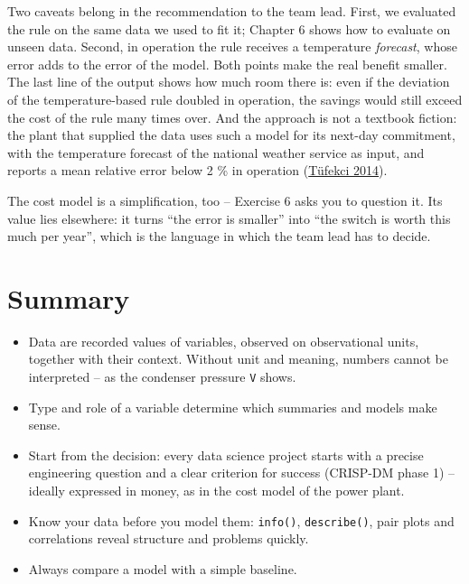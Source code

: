 \documentclass[
  letterpaper,
  DIV=11,
  numbers=noendperiod]{scrreprt}
\providecommand{\tightlist}{%
  \setlength{\itemsep}{0pt}\setlength{\parskip}{0pt}}\usepackage{longtable,booktabs,array}
\begin{document}
Two caveats belong in the recommendation to the team lead. First, we
evaluated the rule on the same data we used to fit it; Chapter 6 shows
how to evaluate on unseen data. Second, in operation the rule receives a
temperature \emph{forecast}, whose error adds to the error of the model.
Both points make the real benefit smaller. The last line of the output
shows how much room there is: even if the deviation of the
temperature-based rule doubled in operation, the savings would still
exceed the cost of the rule many times over. And the approach is not a
textbook fiction: the plant that supplied the data uses such a model for
its next-day commitment, with the temperature forecast of the national
weather service as input, and reports a mean relative error below 2 \%
in operation
(\href{https://doi.org/10.1016/j.ijepes.2014.02.027}{Tüfekci 2014}).

The cost model is a simplification, too -- Exercise 6 asks you to
question it. Its value lies elsewhere: it turns ``the error is smaller''
into ``the switch is worth this much per year'', which is the language
in which the team lead has to decide.

\section{Summary}\label{summary-1}

\begin{tcolorbox}[enhanced jigsaw, left=2mm, title=\textcolor{quarto-callout-important-color}{\faExclamation}\hspace{0.5em}{Key takeaways}, opacityback=0, breakable, rightrule=.15mm, arc=.35mm, toptitle=1mm, colbacktitle=quarto-callout-important-color!10!white, opacitybacktitle=0.6, coltitle=black, colframe=quarto-callout-important-color-frame, bottomrule=.15mm, leftrule=.75mm, bottomtitle=1mm, titlerule=0mm, toprule=.15mm, colback=white]

\begin{itemize}
\tightlist
\item
  Data are recorded values of variables, observed on observational
  units, together with their context. Without unit and meaning, numbers
  cannot be interpreted -- as the condenser pressure \texttt{V} shows.
\item
  Type and role of a variable determine which summaries and models make
  sense.
\item
  Start from the decision: every data science project starts with a
  precise engineering question and a clear criterion for success
  (CRISP-DM phase 1) -- ideally expressed in money, as in the cost model
  of the power plant.
\item
  Know your data before you model them: \texttt{info()},
  \texttt{describe()}, pair plots and correlations reveal structure and
  problems quickly.
\item
  Always compare a model with a simple baseline.
\end{itemize}

\end{tcolorbox}
\end{document}
